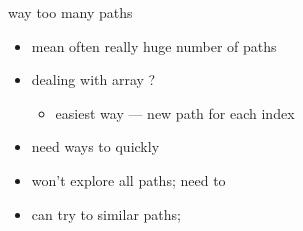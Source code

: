 
\begin{frame}{way too many paths}
    \begin{itemize}
        \item {} mean often really huge number of paths
        \item dealing with array ?
            \begin{itemize}
                \item easiest way --- new path for each index
            \end{itemize}
        \item need ways to quickly 
        \item won't explore all paths; need to 
        \item can try to similar paths; 
    \end{itemize}
\end{frame}

